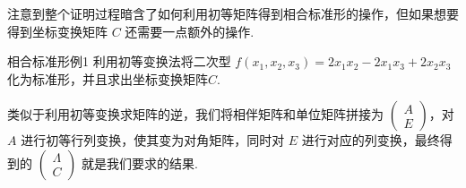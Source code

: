 注意到整个证明过程暗含了如何利用初等矩阵得到相合标准形的操作，但如果想要得到坐标变换矩阵 $C$ 还需要一点额外的操作.

\begin{example}{}{相合标准形例1}
    利用初等变换法将二次型 $f(x_1,x_2,x_3)=2x_1x_2-2x_1x_3+2x_2x_3$ 化为标准形，并且求出坐标变换矩阵$C$.
\end{example}

\begin{solution}
    类似于利用初等变换求矩阵的逆，我们将相伴矩阵和单位矩阵拼接为 $\begin{pmatrix}
        A \\ E
    \end{pmatrix}$，对 $A$ 进行初等行列变换，使其变为对角矩阵，同时对 $E$ 进行对应的列变换，最终得到的 $\begin{pmatrix}
        \Lambda \\ C
    \end{pmatrix}$ 就是我们要求的结果.


\end{solution}
